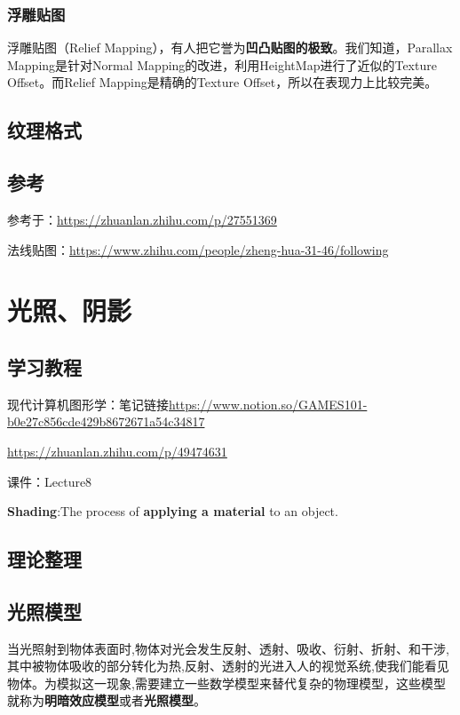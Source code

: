 \documentclass[UTF8,a4paper,12pt]{ctexbook}
\begin{document}
		\subsection{浮雕贴图}
			浮雕贴图（Relief Mapping），有人把它誉为\textbf{凹凸贴图的极致}。我们知道，Parallax Mapping是针对Normal Mapping的改进，利用HeightMap进行了近似的Texture Offset。而Relief Mapping是精确的Texture Offset，所以在表现力上比较完美。
	
	\section{纹理格式}
	
	
	
	\section{参考}
		参考于：\url{https://zhuanlan.zhihu.com/p/27551369}
		
		法线贴图：\url{https://www.zhihu.com/people/zheng-hua-31-46/following}
		
		
				
\chapter{光照、阴影}
	\section{学习教程}
		现代计算机图形学：笔记链接\url{https://www.notion.so/GAMES101-b0e27c856cde429b8672671a54c34817}
		
			\url{https://zhuanlan.zhihu.com/p/49474631}
			
		课件：Lecture8
		
		\textbf{Shading}:The process of \textbf{applying a material} to an object.
		
	\section{理论整理}
		
	\section{光照模型}
		当光照射到物体表面时,物体对光会发生反射、透射、吸收、衍射、折射、和干涉,其中被物体吸收的部分转化为热,反射、透射的光进入人的视觉系统,使我们能看见物体。为模拟这一现象,需要建立一些数学模型来替代复杂的物理模型，这些模型就称为\textbf{明暗效应模型}或者\textbf{光照模型}。
	
\end{document}
